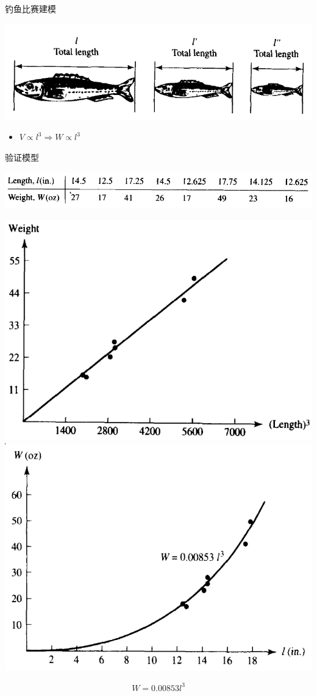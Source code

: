 \documentclass[mathserif]{beamer}
\begin{document}
\begin{frame}{钓鱼比赛建模}
  \begin{center}
    \includegraphics[width=.8\textwidth{}]{fish.png}
  \end{center}

  \begin{itemize}
  \item $V \propto l^3 \Rightarrow W \propto l^3$
  \end{itemize}
\end{frame}

\begin{frame}{验证模型}
  \begin{center}
    \includegraphics[width=.8\textwidth{}]{fishtab.png}
  \end{center}

  \begin{center}
    \includegraphics[width=.4\textwidth{}]{fishlen1.png}
    \includegraphics[width=.4\textwidth{}]{fishlen2.png}
  \end{center}
  \[
  W = 0.00853l^3
  \]
\end{frame}
\end{document}
